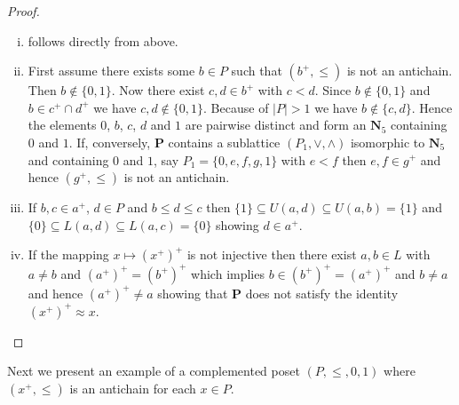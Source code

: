 \documentclass[12pt]{article}
\begin{document}
\begin{proof}
\
\begin{enumerate}[(i)]
\item follows directly from above.
\item First assume there exists some $b\in P$ such that $(b^+,\le)$ is not an antichain. Then $b\notin\{0,1\}$. Now there exist $c,d\in b^+$ with $c<d$. Since $b\notin\{0,1\}$ and $b\in c^+\cap d^+$ we have $c,d\notin\{0,1\}$. Because of $|P|>1$ we have $b\notin\{c,d\}$. Hence the elements $0$, $b$, $c$, $d$ and $1$ are pairwise distinct and form an $\mathbf N_5$ containing $0$ and $1$. If, conversely, $\mathbf P$ contains a sublattice $(P_1,\vee,\wedge)$ isomorphic to $\mathbf N_5$ and containing $0$ and $1$, say $P_1=\{0,e,f,g,1\}$ with $e<f$ then $e,f\in g^+$ and hence $(g^+,\le)$ is not an antichain.
\item If $b,c\in a^+$, $d\in P$ and $b\le d\le c$ then $\{1\}\subseteq U(a,d)\subseteq U(a,b)=\{1\}$ and $\{0\}\subseteq L(a,d)\subseteq L(a,c)=\{0\}$ showing $d\in a^+$.
\item If the mapping $x\mapsto (x^+)^+$ is not injective then there exist $a,b\in L$ with $a\ne b$ and $(a^+)^+=(b^+)^+$ which implies $b\in(b^+)^+=(a^+)^+$ and $b\ne a$ and hence $(a^+)^+\ne a$ showing that $\mathbf P$ does not satisfy the identity $(x^+)^+\approx x$.
\end{enumerate}
\end{proof}

Next we present an example of a complemented poset $(P,\le,0,1)$ where $(x^+,\le)$ is an antichain for each $x\in P$.
\end{document}
